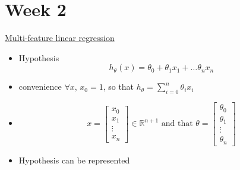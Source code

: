 \documentclass[12pt]{article}
\begin{document}
\section*{Week 2}
\underline{Multi-feature linear regression}\\
\begin{itemize}
\item Hypothesis
\[h_\theta (x) = \theta_0+ \theta_1x_1 +\ldots \theta_nx_n\]
\item convenience $\forall x$, $x_0=1$, so that $h_\theta= \sum_{i=0}^{n}\theta_ix_i$
\item 
$$ x= \begin{bmatrix}
	x_0 \\
	x_1 \\
	\vdots \\
	x_n
\end{bmatrix}
 \in \mathbb{R} ^{n+1}
\text{ and that } \theta = \begin{bmatrix}
	\theta_0 \\
	\theta_1 \\
	\vdots \\
	\theta_n
\end{bmatrix}
$$
\item Hypothesis can be represented
\end{itemize}
\end{document}
